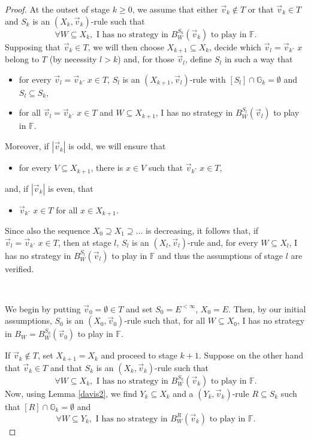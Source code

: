 \documentclass[10pt]{amsart}
\newcommand {\F}{\mathbb F}
\newcommand{\G}{\mathbb G}
\newcommand{\con}{\;\hat{}\;}
\newcommand{\tom} {\emptyset}
\renewcommand {\a} {\forall}
\theoremstyle{definition}
\begin{document}
\begin{proof}
At the outset of stage $k\geqslant 0$, we assume that either $\vec v_k\notin T$ or that $\vec v_k\in T$ and $S_{k}$ is an $(X_k,\vec v_k)$-rule such that 
$$
\a W\subseteq X_k, \text{ I has no strategy in $B^{S_{k}}_W(\vec v_k)$ to play in $\F$}.
$$
Supposing that $\vec v_k\in T$, we will then choose $X_{k+1}\subseteq X_k$, decide which $\vec v_l=\vec v_k\con x$ belong to $T$ (by necessity $l> k$) and, for those $\vec v_l$, define $S_l$ in such a way that 
\begin{itemize} 
\item[(1)] for every $\vec v_l=\vec v_k\con x\in T$, $S_l$ is an $(X_{k+1},\vec v_l)$-rule with $[S_l]\cap \G_k=\tom$ and $S_l\subseteq S_k$,
\item[(2)] for all $\vec v_l=\vec v_k\con x\in T$ and $W\subseteq X_{k+1}$, I has no strategy in $B^{S_l}_W(\vec v_l)$ to play in $\F$.
\end{itemize}
Moreover, if $|\vec v_k|$ is odd, we will ensure that
\begin{itemize}
\item[(3)] for every $V\subseteq  X_{k+1}$, there is $x\in V$ such that $\vec v_k\con x\in T$,  
\end{itemize}
and, if $|\vec v_k|$ is even, that 
\begin{itemize}
\item[(3')] $\vec v_k\con x\in T$ for all $x\in X_{k+1}$.
\end{itemize}
Since also the sequence $X_0\supseteq X_1\supseteq \ldots$ is decreasing, it follows that, if $\vec v_l=\vec v_k\con x\in T$, then at stage $l$,   $S_l$ is an $(X_{l},\vec v_l)$-rule and, for every $W\subseteq X_{l}$, I has no strategy in $B^{S_l}_W(\vec v_l)$ to play in $\F$ and thus the assumptions of stage $l$ are verified.



\


 We begin by putting $\vec v_0=\tom \in T$ and set $S_{0}=E^{<\infty}$, $X_0=E$. Then, by our initial assumptions, $S_0$ is an $(X_0,\vec v_0)$-rule such that, for all $W\subseteq X_0$, I has no strategy in $B_W=B_W^{S_0}(\vec v_0)$ to play in $\F$.

 If $\vec v_k\notin T$, set $X_{k+1}=X_k$ and proceed to stage $k+1$. Suppose on the other hand that $\vec v_k\in T$ and that $S_{k}$ is an $(X_k,\vec v_k)$-rule such that 
$$
\a W\subseteq X_k, \text{ I has no strategy in $B^{S_{k}}_W(\vec v_k)$ to play in $\F$}.
$$
Now, using Lemma \ref{davis2}, we find $Y_{k}\subseteq X_k$ and a $(Y_k,\vec v_k)$-rule $R\subseteq S_{k}$ such that $[R]\cap \G_k=\tom$ and 
$$
\a W\subseteq Y_k, \text{ I has no strategy in $B^{R}_W(\vec v_k)$ to play in $\F$}.
$$


\end{proof}
\end{document}
